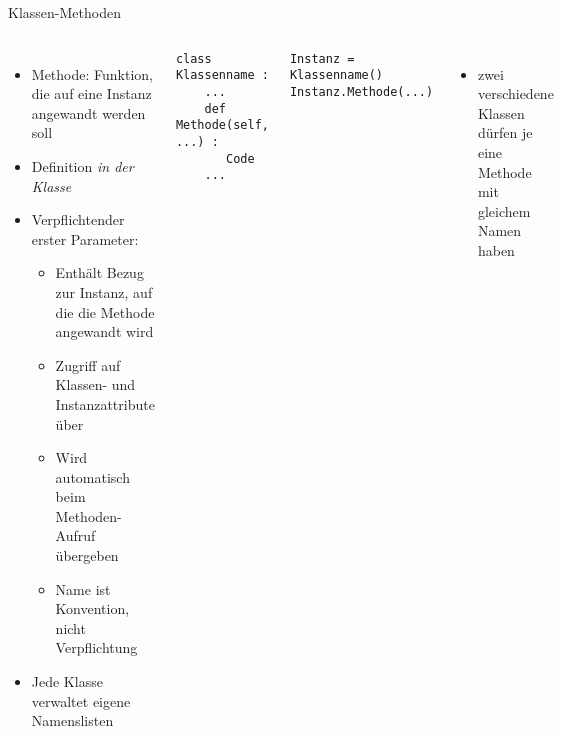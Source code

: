 \begin{frame}[fragile]{Klassen-Methoden}
%
\begin{columns}[T]
\begin{itemize}
\item Methode: Funktion, die auf eine Instanz angewandt werden soll
\item Definition \emph{in der Klasse}
\item Verpflichtender erster Parameter: 
	\begin{itemize}
	\item Enthält Bezug zur Instanz, auf die die Methode angewandt wird
	\item[\Thus] Zugriff auf Klassen- und Instanzattribute über 
	\item Wird automatisch beim Methoden-Aufruf übergeben
	\item Name ist Konvention, nicht Verpflichtung
	\end{itemize}
\item Jede Klasse verwaltet eigene Namenslisten
\end{itemize}
%
\begin{codebox}
\begin{verbatim}
class Klassenname :
    ...
    def Methode(self, ...) :
       Code
    ...
\end{verbatim}
\end{codebox}
%
\begin{codebox}
\begin{verbatim}
Instanz = Klassenname()
Instanz.Methode(...)
\end{verbatim}
\end{codebox}
%
\begin{itemize}
\item[\Thus] zwei verschiedene Klassen dürfen je eine Methode mit gleichem Namen haben
\end{itemize}
\end{columns}
%
\end{frame}


